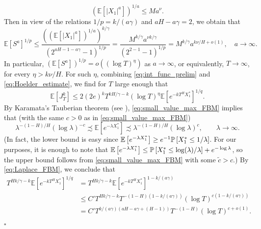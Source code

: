 \documentclass[11pt]{article}
\theoremstyle{plain}
\theoremstyle{definition}
\renewenvironment{proof}[1][] {\smallskip \noindent {\bf Proof#1.} }{\hspace*{\fill}$\square$\medskip\par}
\begin{document}
\begin{proof}[ of Proposition~\ref{prop:moment_disorder_current_functional}]
\begin{equation}\label{eq:moment_estimate_SSSI}
   ({\mathbb{E}\left[{{\lvert{X_1}\rvert}^a}\right]})^{1/a} \le M a^\nu.
\end{equation}
Then in view of the relations $1/p = k/(a \gamma)$ and $aH - a\gamma = 2$, we obtain that
\[
   {\mathbb{E}\left[{S^{a} }\right]}^{1/p} \le \frac{\left( ({\mathbb{E}\left[{{\lvert{X_1}\rvert}^a}\right]})^{1/a} \right)^{k/\gamma} }{(2^{aH - 1 - a\gamma} - 1)^{1/p}} = \frac{M^{k/\gamma} a^{\nu k/\gamma} }{(2^{2 - 1} - 1)^{1/p}} = M^{k/\gamma} a^{k\nu/H + o(1)}, \quad a \to \infty.
\]
In particular, $({\mathbb{E}\left[{S^{a}}\right]})^{1/p} = o((\log T)^{\eta})$ as $a \to \infty$, or equivalently, $T \to \infty$, for every $\eta > k \nu /H$. For such $\eta$, combining \eqref{eq:int_func_prelim} and \eqref{eq:Hoelder_estimate}, we find for $T$ large enough that
\begin{equation}\label{eq:upper_bound_SSSI}
   {\mathbb{E}\left[{J_T^k}\right]} \le 2 (2e)^k T^{kH/\gamma - k} (\log T)^\eta {\mathbb{E}\left[{e^{-kT^H X_1^*}}\right]}^{1/q}.
\end{equation}
By Karamata's Tauberian theorem (see \cite[Theorem~1.7.1]{b-g-t}), \eqref{eq:small_value_max_FBM} implies that (with the same $c > 0$ as in \eqref{eq:small_value_max_FBM})
\begin{equation}\label{eq:Laplace_FBM}
   \lambda^{-(1-H)/H} (\log \lambda )^{-c} \precsim {\mathbb{E}\left[{ e^{- \lambda X_1^*}}\right]} \precsim \lambda^{-(1-H)/H} (\log \lambda )^{c}, \qquad \lambda \to \infty.
\end{equation}
(In fact, the lower bound is easy since ${\mathbb{E}\left[{ e^{- \lambda X_1^*}}\right]} \ge e^{-1} {{{\bf {\mathbb{P}}}}\left[{X_1^* \le 1/\lambda}\right]}$. For our purposes, it is enough to note that ${\mathbb{E}\left[{ e^{- \lambda X_1^*}}\right]} \le {{{\bf {\mathbb{P}}}}\left[{X_1^* \le \log(\lambda)/\lambda}\right]} + e^{-\log \lambda}$, so the upper bound follows from \eqref{eq:small_value_max_FBM} with some $\tilde{c} > c$.) By \eqref{eq:Laplace_FBM}, we conclude that
\begin{align*}
  T^{Hk/\gamma - k} {\mathbb{E}\left[{ e^{- kT^H X_1^*}}\right]}^{1/q} &= T^{Hk/\gamma - k} {\mathbb{E}\left[{ e^{-kT^H X_1^*}}\right]}^{1 - k/(a \gamma)} \\
&\le C' T^{Hk/\gamma - k} T^{-(1-H)(1 - k/(a \gamma)) } (\log T)^{c(1 - k/(a \gamma))} \\
&= C' T^{k/(a\gamma) (aH - a\gamma + (H-1))} T^{-(1-H)} (\log T)^{c + o(1)}.
\end{align*}

\end{proof}
\end{document}
